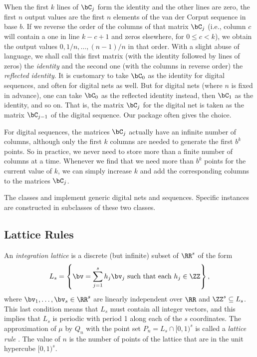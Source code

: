 When the first $k$ lines of $\bC_j$ form the identity and the other
lines are zero, the first $n$ output values are the first $n$ elements
of the van der Corput sequence in base $b$.
If we reverse the order of the columns of that matrix $\bC_j$
(i.e., column $c$ will contain a one in line $k-c+1$ and zeros elsewhere,
for $0\le c < k$), we obtain the output values
$0, 1/n, \dots, (n-1)/n$ in that order.
With a slight abuse of language, we shall call this first matrix
(with the identity followed by lines of zeros) the \emph{identity}
and the second one (with the columns in reverse order) the
\emph{reflected identity}.
It is customary to take $\bC_0$ as the identity for digital sequences,
and often for digital nets as well.
But for digital nets (where $n$ is fixed in advance),
one can take $\bC_0$ as the reflected identity instead,
then $\bC_1$ as the identity, and so on.
That is, the matrix $\bC_j$ for the digital net is taken as the matrix
$\bC_{j-1}$ of the digital sequence.
Our package often gives the choice.

For digital sequences, the matrices $\bC_j$ actually have an infinite
number of columns, although only the first $k$ columns are needed to
generate the first $b^k$ points.  So in practice, we never need to store
more than a finite number of columns at a time.
Whenever we find that we need more than $b^k$ points for the current
value of $k$, we can simply increase $k$ and add the corresponding
columns to the matrices $\bC_j$.

The classes 
 and 
implement generic digital nets and sequences.
Specific instances are constructed in subclasses of these two classes.


\subsection*{Lattice Rules}

An \emph{integration lattice} is a discrete (but infinite)
subset of $\RR^s$ of the form
\[
 L_s = \left\{\bv = \sum_{j=1}^s h_j {\bv_j}
             \mbox{ such that each } h_j\in\ZZ\right\},
\]
where $\bv_1,\dots,\bv_s \in \RR^s$ are linearly independent over $\RR$
and $\ZZ^s \subseteq L_s$.  This last condition means that
$L_s$ must contain all integer vectors, and this implies that
$L_s$ is periodic with period 1 along each of the $s$ coordinates.
The approximation of $\mu$ by $Q_n$ with the point set
$P_n = L_s \cap [0,1)^s$ is called a \emph{lattice rule}
\cite{mKOR59a,vSLO94a}.  The value of $n$ is the number of points
of the lattice that are in the unit hypercube $[0,1)^s$.

